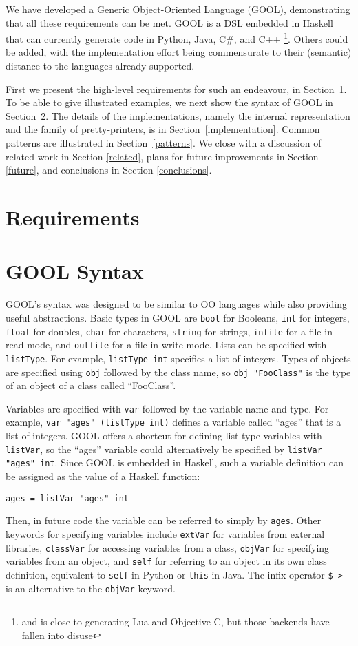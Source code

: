 \documentclass[sigplan,review,anonymous]{acmart}
\begin{document}
We have developed a Generic Object-Oriented Language (GOOL), demonstrating
that all these requirements can be met.  GOOL is a DSL embedded in Haskell that
can currently generate code in Python, Java, C\#, and C++%
\footnote{and is close to generating Lua and Objective-C, but those backends
have fallen into disuse}. Others could be added, with the implementation
effort being commensurate to their (semantic) distance to the languages
already supported.

First we present the high-level requirements for such an endeavour, in
Section~\ref{sec:req}.  To be able to give illustrated examples, we
next show the syntax of GOOL in Section~\ref{syntax}. The details of
the implementations, namely the internal representation and the
family of pretty-printers, is in Section~\ref{implementation}.
Common patterns are illustrated in Section~\ref{patterns}.  We 
close with a discussion of related work in Section \ref{related}, plans for 
future improvements in Section \ref{future}, and conclusions in Section 
\ref{conclusions}.

\section{Requirements} \label{sec:req}
\section{GOOL Syntax} \label{syntax}

GOOL's syntax was designed to be similar to OO languages while also providing 
useful abstractions. Basic types in GOOL are \verb|bool| for Booleans, 
\verb|int| for integers, \verb|float| for doubles, \verb|char| 
for characters, \verb|string| for strings, \verb|infile| for a file 
in read mode, and \verb|outfile| for a file in write mode. Lists can be 
specified with \verb|listType|. For example, \verb|listType int| 
specifies a list of integers. Types of objects are specified using 
\verb|obj| followed by the class name, so \verb|obj "FooClass"| is the type of 
an object of a class called ``FooClass''. 

Variables are specified with \verb|var| followed by the variable name and type. 
For example, \verb|var "ages" (listType int)| defines a variable called 
``ages'' that is a list of integers. GOOL offers a shortcut for defining 
list-type variables with \verb|listVar|, so the ``ages'' variable could 
alternatively be specified by \verb|listVar "ages" int|. Since GOOL is embedded 
in Haskell, such a variable definition can be assigned as the value of a 
Haskell function:
\begin{lstlisting}
ages = listVar "ages" int
\end{lstlisting}
Then, in future code the variable can be referred to simply by \verb|ages|. 
Other keywords for specifying variables include \verb|extVar| for variables 
from external libraries, \verb|classVar| for accessing variables from a class, 
\verb|objVar| for specifying variables from an object, and \verb|self| for 
referring to an object in its own class definition, equivalent to \verb|self| 
in Python or \verb|this| in Java. The infix operator \verb|$->| is an 
alternative to the \verb|objVar| keyword.
\end{document}

